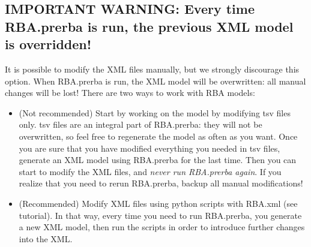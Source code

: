 \documentclass[12pt]{scrartcl}
\theoremstyle{definition}
\theoremstyle{remark}
\numberwithin{equation}{section}
\begin{document}
\subsection{IMPORTANT WARNING: Every time RBA.prerba is run, the previous XML model is overridden!}

It is possible to modify the XML files manually,
but we strongly discourage this option.
When RBA.prerba is run, the XML model will be overwritten:
all manual changes will be lost!
There are two ways to work with RBA models:
\begin{itemize}
  \item (Not recommended) Start by working on the model by modifying tsv files only.
  tsv files are an integral part of RBA.prerba: they will not be overwritten,
  so feel free to regenerate the model as often as you want.
  Once you are sure that you have modified everything you needed in tsv files,
  generate an XML model using RBA.prerba for the last time.
  Then you can start to modify the XML files, and \emph{never run RBA.prerba again}.
  If you realize that you need to rerun RBA.prerba, backup all manual modifications!
  \item (Recommended) Modify XML files using python scripts with RBA.xml (see tutorial).
  In that way, every time you need to run RBA.prerba, you generate a new XML model,
  then run the scripts in order to introduce further changes into the XML.
\end{itemize}


\clearpage



\appendix


%
%
\end{document}
